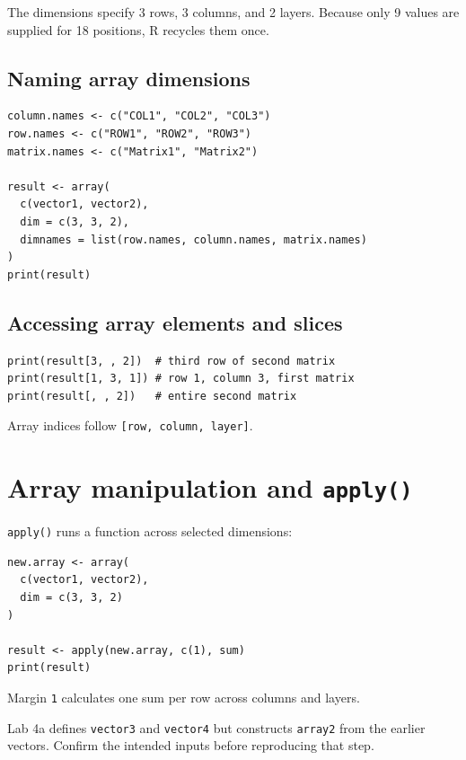 The dimensions specify 3 rows, 3 columns, and 2 layers. Because only 9 values are supplied for 18 positions, R recycles them once.

\subsection{Naming array dimensions}

\begin{lstlisting}[style=dsr]
column.names <- c("COL1", "COL2", "COL3")
row.names <- c("ROW1", "ROW2", "ROW3")
matrix.names <- c("Matrix1", "Matrix2")

result <- array(
  c(vector1, vector2),
  dim = c(3, 3, 2),
  dimnames = list(row.names, column.names, matrix.names)
)
print(result)
\end{lstlisting}

\subsection{Accessing array elements and slices}

\begin{lstlisting}[style=dsr]
print(result[3, , 2])  # third row of second matrix
print(result[1, 3, 1]) # row 1, column 3, first matrix
print(result[, , 2])   # entire second matrix
\end{lstlisting}

Array indices follow \texttt{[row, column, layer]}.

\section{Array manipulation and \texttt{apply()}}

\texttt{apply()} runs a function across selected dimensions:

\begin{lstlisting}[style=dsr]
new.array <- array(
  c(vector1, vector2),
  dim = c(3, 3, 2)
)

result <- apply(new.array, c(1), sum)
print(result)
\end{lstlisting}

Margin \texttt{1} calculates one sum per row across columns and layers.

\begin{pitfall}
Lab 4a defines \texttt{vector3} and \texttt{vector4} but constructs \texttt{array2} from the earlier vectors. Confirm the intended inputs before reproducing that step.
\end{pitfall}

